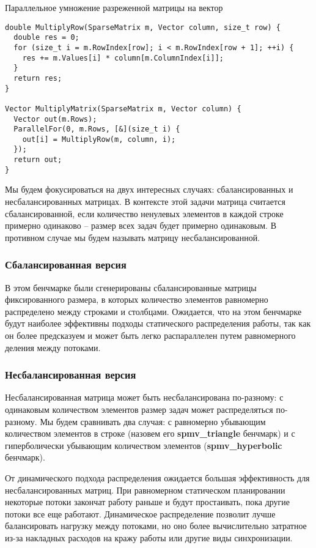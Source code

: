 \documentclass[times,specification,annotation]{itmo-student-thesis}
\begin{document}
\begin{algorithm}[!h]
\caption{Параллельное умножение разреженной матрицы на вектор}\label{lstspmv}
\begin{lstlisting}
double MultiplyRow(SparseMatrix m, Vector column, size_t row) {
  double res = 0;
  for (size_t i = m.RowIndex[row]; i < m.RowIndex[row + 1]; ++i) {
    res += m.Values[i] * column[m.ColumnIndex[i]];
  }
  return res;
}

Vector MultiplyMatrix(SparseMatrix m, Vector column) {
  Vector out(m.Rows);
  ParallelFor(0, m.Rows, [&](size_t i) {
    out[i] = MultiplyRow(m, column, i);
  });
  return out;
}
\end{lstlisting}
\end{algorithm}

Мы будем фокусироваться на двух интересных случаях: сбалансированных и несбалансированных матрицах. В контексте этой задачи матрица считается сбалансированной, если количество ненулевых элементов в каждой строке примерно одинаково -- размер всех задач будет примерно одинаковым. В противном случае мы будем называть матрицу несбалансированной.

\subsubsection{Сбалансированная версия}
В этом бенчмарке были сгенерированы сбалансированные матрицы фиксированного размера, в которых количество элементов равномерно распределено между строками и столбцами. Ожидается, что на этом бенчмарке будут наиболее эффективны подходы статического распределения работы, так как он более предсказуем и может быть легко распараллелен путем равномерного деления между потоками.

\subsubsection{Несбалансированная версия}
Несбалансированная матрица может быть несбалансирована по-разному: с одинаковым количеством элементов размер задач может распределяться по-разному. Мы будем сравнивать два случая: с равномерно убывающим количеством элементов в строке (назовем его \textbf{spmv\_triangle} бенчмарк) и с гиперболически убывающим количеством элементов (\textbf{spmv\_hyperbolic} бенчмарк).

От динамического подхода распределения ожидается большая эффективность для несбалансированных матриц. При равномерном статическом планировании некоторые потоки закончат работу раньше и будут простаивать, пока другие потоки все еще работают. Динамическое распределение позволит лучше балансировать нагрузку между потоками, но оно более вычислительно затратное из-за накладных расходов на кражу работы или другие виды синхронизации.
\end{document}
